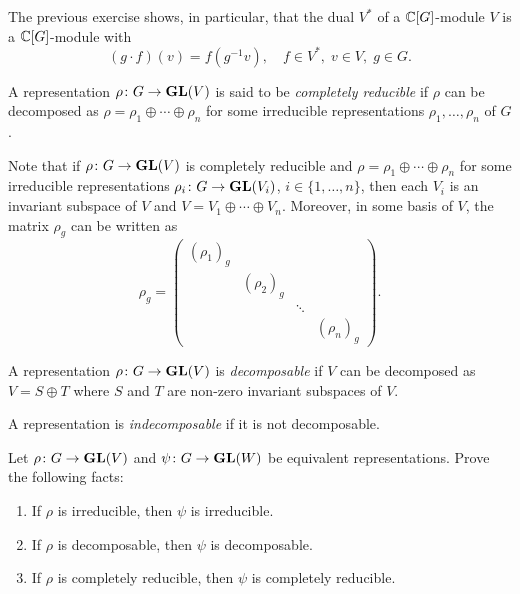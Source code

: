 The previous exercise shows, in particular, 
that the dual $V^*$ of a $\mathbb{C}[G]$-module $V$ 
is a $\mathbb{C}[G]$-module with
\[
(g\cdot f)(v)=f(g^{-1}v),\quad
f\in V^*,\;v\in V,\;g\in G.
\]

\begin{definition}
    A representation $\rho\colon G\to\mathbf{GL}(V)$ is said to be 
    \emph{completely reducible}
    if $\rho$ can be decomposed as
    $\rho=\rho_1\oplus\cdots\oplus \rho_n$ for some irreducible
    representations $\rho_1,\dots,\rho_n$ of $G$. 
\end{definition}

Note that if $\rho\colon G\to\mathbf{GL}(V)$ is completely reducible and 
$\rho=\rho_1\oplus\cdots\oplus \rho_n$ for some irreducible representations 
$\rho_i\colon G\to\mathbf{GL}(V_i)$, $i\in\{1,\dots,n\}$, then 
each $V_i$ is an invariant subspace of $V$ and $V=V_1\oplus \cdots\oplus V_n$. 
Moreover, in some basis of $V$, the matrix  
$\rho_g$ can be written as 
\[
\rho_g=\begin{pmatrix}
(\rho_1)_g &  \\
& (\rho_2)_g  \\
&&\ddots\\
&&&(\rho_n)_g	
\end{pmatrix}.
\]

\begin{definition}
A representation
$\rho\colon G\to\mathbf{GL}(V)$ is \emph{decomposable} if $V$ can be decomposed as $V=S\oplus T$
where $S$ and $T$ are non-zero invariant subspaces of $V$. 
\end{definition}

A representation is 
\emph{indecomposable} if it is not decomposable. 

\begin{exercise}
\label{xca:equivalence}
	Let $\rho\colon G\to\mathbf{GL}(V)$ and $\psi\colon G\to\mathbf{GL}(W)$ be equivalent representations.
	Prove the following facts:
	\begin{enumerate}
		\item If $\rho$ is irreducible, then $\psi$ is irreducible.
		\item If $\rho$ is decomposable, then $\psi$ is decomposable.
		\item If $\rho$ is completely reducible, then $\psi$ is completely reducible. 
	\end{enumerate}	
\end{exercise}


